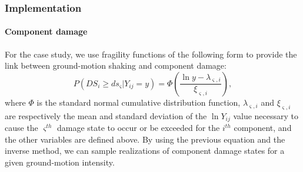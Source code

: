 \subsubsection{Implementation}
\paragraph{Component damage}


For the case study, we use fragility functions of the following form to provide the link between ground-motion shaking and component damage:
\begin{equation}
P(DS_i \geq ds_\varsigma |Y_{ij} = y) = \Phi \left( \frac{\ln y - \lambda_{\varsigma, i}}{\xi_{\varsigma,i}} \right),
\label{eq:dsfull}
\end{equation}
where $\Phi$ is the standard normal cumulative distribution function, $\lambda_{\varsigma,i}$ and $\xi_{\varsigma,i}$ are respectively the mean and standard deviation of the $\ln Y_{ij}$ value necessary to cause the $\varsigma^{th}$ damage state to occur or be exceeded for the $i^{th}$ component, and the other variables are defined above. By using the previous equation and the inverse method, we can sample realizations of component damage states for a given ground-motion intensity.
%
%


